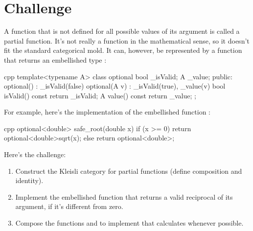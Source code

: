 \section{Challenge}

A function that is not defined for all possible values of its argument
is called a partial function. It's not really a function in the
mathematical sense, so it doesn't fit the standard categorical mold. It
can, however, be represented by a function that returns an embellished
type :

\begin{snip}{cpp}
template<typename A>
class optional {
    bool _isValid;
    A _value;
public:
    optional()    : _isValid(false) {}
    optional(A v) : _isValid(true), _value(v) {}
    bool isValid() const { return _isValid; }
    A value() const { return _value; }
};
\end{snip}
For example, here's the implementation of the embellished function
:

\begin{snip}{cpp}
optional<double> safe_root(double x) {
    if (x >= 0) return optional<double>{sqrt(x)};
    else return optional<double>{};
}
\end{snip}
Here's the challenge:

\begin{enumerate}
  \tightlist
  \item
        Construct the Kleisli category for partial functions (define
        composition and identity).
  \item
        Implement the embellished function  that
        returns a valid reciprocal of its argument, if it's different from
        zero.
  \item
        Compose the functions  and  to implement
         that calculates 
        whenever possible.
\end{enumerate}
